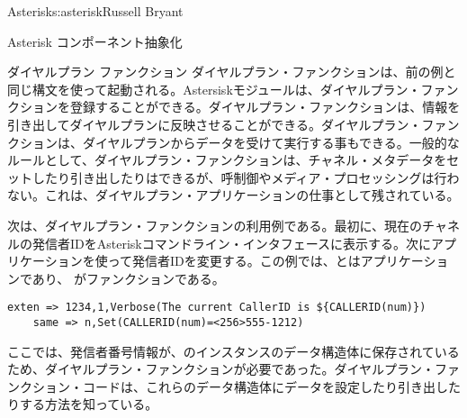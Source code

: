 \begin{aosachapter}{Asterisk}{s:asterisk}{Russell Bryant}
\begin{aosasect1}{Asterisk コンポーネント抽象化}
\begin{aosasect2}{ダイヤルプラン ファンクション}
ダイヤルプラン・ファンクションは、前の例と同じ構文を使って起動される。Astersiskモジュールは、ダイヤルプラン・ファンクションを登録することができる。ダイヤルプラン・ファンクションは、情報を引き出してダイヤルプランに反映させることができる。ダイヤルプラン・ファンクションは、ダイヤルプランからデータを受けて実行する事もできる。一般的なルールとして、ダイヤルプラン・ファンクションは、チャネル・メタデータをセットしたり引き出したりはできるが、呼制御やメディア・プロセッシングは行わない。これは、ダイヤルプラン・アプリケーションの仕事として残されている。

次は、ダイヤルプラン・ファンクションの利用例である。最初に、現在のチャネルの発信者IDをAsteriskコマンドライン・インタフェースに表示する。次にアプリケーションを使って発信者IDを変更する。この例では、とはアプリケーションであり、 がファンクションである。

\begin{verbatim}
exten => 1234,1,Verbose(The current CallerID is ${CALLERID(num)})
    same => n,Set(CALLERID(num)=<256>555-1212)
\end{verbatim}

\noindent ここでは、発信者番号情報が、のインスタンスのデータ構造体に保存されているため、ダイヤルプラン・ファンクションが必要であった。ダイヤルプラン・ファンクション・コードは、これらのデータ構造体にデータを設定したり引き出したりする方法を知っている。


\end{aosasect2}
\end{aosasect1}
\end{aosachapter}
